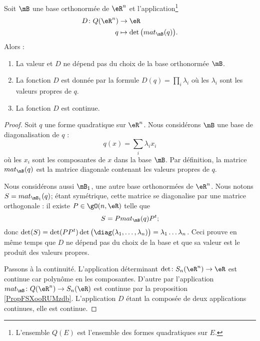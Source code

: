 \begin{proposition} \label{PropOXWooYrDKpw}
    Soit \( \mB\) une base orthonormée de \( \eR^n\) et l'application\footnote{L'ensemble \( Q(E)\) est l'ensemble des formes quadratiques sur \( E\).}
    \begin{equation}
        \begin{aligned}
            D\colon Q(\eR^n)&\to \eR \\
            q&\mapsto \det\big( mat_{\mB}(q) \big) .
        \end{aligned}
    \end{equation}
    Alors :
    \begin{enumerate}
        \item
            La valeur et \( D\) ne dépend pas du choix de la base orthonormée \( \mB\).
        \item
            La fonction \( D\) est donnée par la formule \( D(q)=\prod_i\lambda_i\) où les \( \lambda_i\) sont les valeurs propres de \( q\).
        \item
            La fonction \( D\) est continue.
    \end{enumerate}
\end{proposition}

\begin{proof}
    Soit \( q\) une forme quadratique sur \( \eR^n\). Nous considérons \( \mB\) une base de diagonalisation de \( q\) :
    \begin{equation}
        q(x)=\sum_i\lambda_ix_i
    \end{equation}
    où les \( x_i\) sont les composantes de \( x\) dans la base \( \mB\). Par définition, la matrice \( mat_{\mB}(q)\) est la matrice diagonale contenant les valeurs propres de \( q\).

    Nous considérons aussi \( \mB_1\), une autre base orthonormées de \( \eR^n\). Nous notons \( S=mat_{\mB_1}(q)\); étant symétrique, cette matrice se diagonalise par une matrice orthogonale : il existe \( P\in\gO(n,\eR)\) telle que
    \begin{equation}
        S=P mat_{\mB}(q)P^t;
    \end{equation}
    donc \( \det(S)=\det(PP^t)\det\big( \diag(\lambda_1,\ldots, \lambda_n) \big)=\lambda_1\ldots\lambda_n\). Ceci prouve en même temps que \( D\) ne dépend pas du choix de la base et que sa valeur est le produit des valeurs propres.

    Passons à la continuité. L'application déterminant \( \det\colon S_n(\eR^n)\to \eR\) est continue car polynôme en les composantes. D'autre par l'application \( mat_{\mB}\colon Q(\eR^n)\to S_n(\eR)\) est continue par la proposition \ref{PropFSXooRUMzdb}. L'application  \( D\) étant la composée de deux applications continues, elle est continue.
\end{proof}

